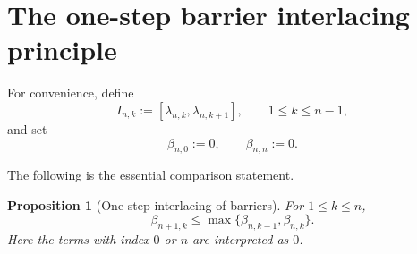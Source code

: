 \documentclass[11pt]{amsart}
\numberwithin{equation}{section}
\newtheorem{proposition}[theorem]{Proposition}
\begin{document}
\section{The one-step barrier interlacing principle}

For convenience, define
\[
        I_{n,k}:=[\lambda_{n,k},\lambda_{n,k+1}],
        \qquad
        1\le k\le n-1,
\]
and set
\[
        \beta_{n,0}:=0,\qquad \beta_{n,n}:=0.
\]

The following is the essential comparison statement.

\begin{proposition}[One-step interlacing of barriers]\label{prop:local-barrier}
For \(1\le k\le n\),
\[
        \beta_{n+1,k}
        \le
        \max\{\beta_{n,k-1},\beta_{n,k}\}.
\]
Here the terms with index \(0\) or \(n\) are interpreted as \(0\).
\end{proposition}
\end{document}
